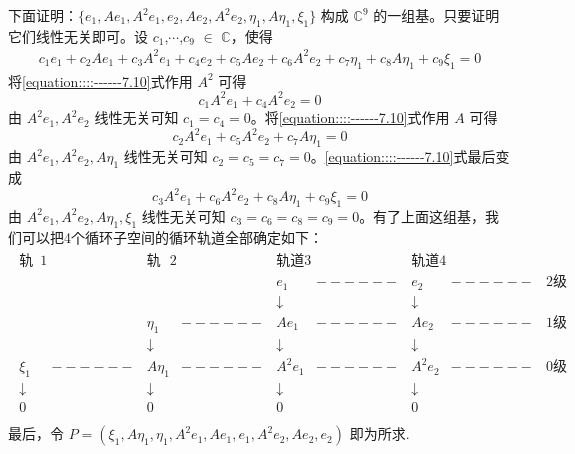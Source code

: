 \documentclass[../../main.tex]{subfiles}
\begin{document}
\begin{solution}
下面证明：$\{e_1,Ae_1,A^2e_1,e_2,Ae_2,A^2e_2,\eta_1,A\eta_1,\xi_1\}$ 构成 $\mathbb{C}^9$ 的一组基。只要证明它们线性无关即可。设 $c_1$,$\cdots$,$c_9$ $\in$ $\mathbb{C}$，使得
\begin{align}
c_1e_1 + c_2Ae_1 + c_3A^2e_1 + c_4e_2 + c_5Ae_2 + c_6A^2e_2 + c_7\eta_1 + c_8A\eta_1 + c_9\xi_1 = 0\label{equation::::------7.10}
\end{align}
将\eqref{equation::::------7.10}式作用 $A^2$ 可得
\[c_1A^2e_1 + c_4A^2e_2 = 0\]
由 $A^2e_1,A^2e_2$ 线性无关可知 $c_1 = c_4 = 0$。将\eqref{equation::::------7.10}式作用 $A$ 可得
\[c_2A^2e_1 + c_5A^2e_2 + c_7A\eta_1 = 0\]
由 $A^2e_1,A^2e_2,A\eta_1$ 线性无关可知 $c_2 = c_5 = c_7 = 0$。\eqref{equation::::------7.10}式最后变成
\[c_3A^2e_1 + c_6A^2e_2 + c_8A\eta_1 + c_9\xi_1 = 0\]
由 $A^2e_1,A^2e_2,A\eta_1,\xi_1$ 线性无关可知 $c_3 = c_6 = c_8 = c_9 = 0$。有了上面这组基，我们可以把4个循环子空间的循环轨道全部确定如下：
\begin{align*}
\begin{matrix}
\text{轨道}1&		&		\text{轨道}2&		&		\text{轨道}3&		&		\text{轨道}4&		&		\\
&		&		&		&		e_1&		------&		e_2&		------&		2\text{级广义特征向量}\\
&		&		&		&		\downarrow&		&		\downarrow&		&		\\
&		&		\eta _1&		------&		Ae_1&		------&		Ae_2&		------&		1\text{级广义特征向量}\\
&		&		\downarrow&		&		\downarrow&		&		\downarrow&		&		\\
\xi _1&		------&		A\eta _1&		------&		A^2e_1&		------&		A^2e_2&		------&		0\text{级广义特征向量}\\
\downarrow&		&		\downarrow&		&		\downarrow&		&		\downarrow&		&		\\
0&		&		0&		&		0&		&		0&		&		\\
\end{matrix}
\end{align*}
最后，令 $P = (\xi_1,A\eta_1,\eta_1,A^2e_1,Ae_1,e_1,A^2e_2,Ae_2,e_2)$ 即为所求.
\end{solution}
\end{document}
